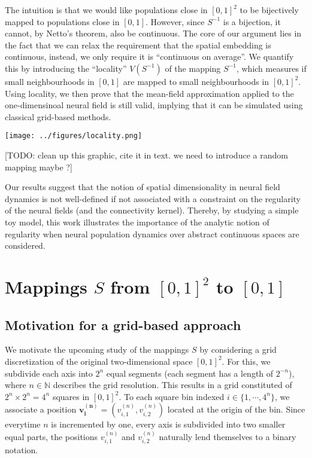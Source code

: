 \documentclass[10pt,letterpaper]{article}
\renewcommand{\vec}[1]{\boldsymbol{#1}}
\begin{document}
The intuition is that we would like populations close in $[0,1]^2$ to be bijectively mapped to populations close in $[0,1]$. However, since $S^{-1}$ is a bijection, it cannot, by Netto's theorem, also be continuous. The core of our argument lies in the fact that we can relax the requirement that the spatial embedding is continuous, instead, we only require it is ``continuous on average''. We quantify this by introducing the ``locality'' $V(S^{-1})$ of the mapping $S^{-1}$, which measures if small neighbourhoods in $[0,1]$ are mapped to small neighbourhoods in $[0,1]^2$. Using locality, we then prove that the mean-field approximation applied to the one-dimensinoal neural field is still valid, implying that it can be simulated using classical grid-based methods.

\texttt{[image: ../figures/locality.png]}

[TODO: clean up this graphic, cite it in text. we need to introduce a random mapping maybe ?]
\endif

Our results suggest that the notion of spatial dimensionality in neural field dynamics is not well-defined if not associated with a constraint on the regularity of the neural fields (and the connectivity kernel). Thereby, by studying a simple toy model, this work illustrates the importance of the analytic notion of regularity when neural population dynamics over abstract continuous spaces are considered. 

\section{Mappings $S$ from $[0,1]^2$ to $[0,1]$}

\subsection{Motivation for a grid-based approach} \label{sec:grid-motivation}

We motivate the upcoming study of the mappings $S$ by considering a grid discretization of the original two-dimensional space $[0,1]^2$. For this, we subdivide each axis into $2^n$ equal segments (each segment has a length of $2^{-n}$), where $n \in \mathbb{N}$ describes the grid resolution. This results in a grid constituted of $2^n \times 2^n = 4^n$ squares in $[0,1]^2$. To each square bin indexed $i \in \{1,\cdots,4^n\}$, we associate a position $\vec{v_i^{(n)}} = (v_{i,1}^{(n)}, v_{i,2}^{(n)})$ located at the origin of the bin. Since everytime $n$ is incremented by one, every axis is subdivided into two smaller equal parts, the positions $v_{i,1}^{(n)}$ and $v_{i,2}^{(n)}$ naturally lend themselves to a binary notation.
\end{document}
